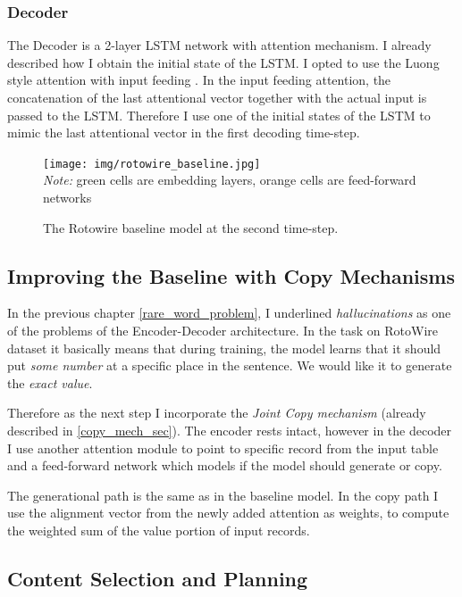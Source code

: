 \subsubsection{Decoder}

The Decoder is a 2-layer LSTM network with attention mechanism. I already described how I obtain the initial state of the LSTM. I opted to use the Luong style attention with input feeding \citep{luong2015effective}. In the input feeding attention, the concatenation of the last attentional vector together with the actual input is passed to the LSTM. Therefore I use one of the initial states of the LSTM to mimic the last attentional vector in the first decoding time-step.

\begin{figure}
    \centering
    \texttt{[image: img/rotowire\_baseline.jpg]}
    \footnotesize{\\ \textit{Note:} green cells are embedding layers, orange cells are feed-forward networks}
    \caption{\centering The Rotowire baseline model at the second time-step.}
\end{figure}

\subsection{Improving the Baseline with Copy Mechanisms}

In the previous chapter \ref{rare_word_problem}, I underlined \emph{hallucinations} as one of the problems of the Encoder-Decoder architecture. In the task on RotoWire dataset it basically means that during training, the model learns that it should put \emph{some number} at a specific place in the sentence. We would like it to generate the \emph{exact value}.

Therefore as the next step I incorporate the \emph{Joint Copy mechanism} \citep{gu2016incorporating} (already described in \ref{copy_mech_sec}). The encoder rests intact, however in the decoder I use another attention module to point to specific record from the input table and a feed-forward network which models if the model should generate or copy.

The generational path is the same as in the baseline model. In the copy path I use the alignment vector from the newly added attention as weights, to compute the weighted sum of the value portion of input records.

\subsection{Content Selection and Planning}

